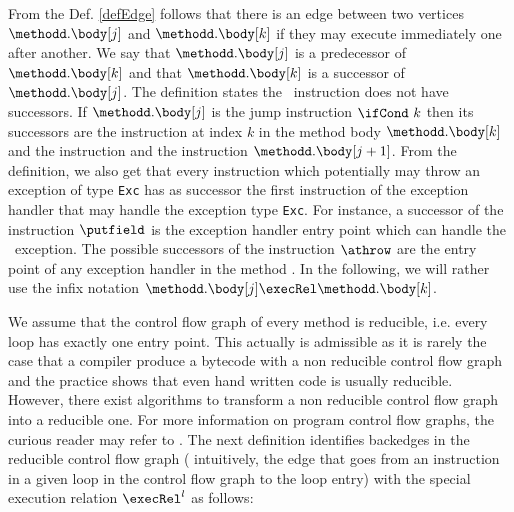 From the Def. \ref{defEdge} follows that there is an edge between two vertices $\methodd.\body[j]$ and  $\methodd.\body[k]$ if they may execute immediately one after another.
 We say that $\methodd.\body[j]$ is a predecessor of $\methodd.\body[k]$ and that  $\methodd.\body[k]$ is a successor of  $\methodd.\body[j]$.
 The definition states the \return \  instruction  does not have successors.
If  $\methodd.\body[j ]$ is the jump instruction $ \ifCond \ k $ then  its successors are the instruction at index $k$ in the method body   
$\methodd.\body[k]$ and the instruction and the instruction $\methodd.\body[j + 1 ]$. 
From the definition, we also get that every instruction which potentially may throw an exception of type \texttt{Exc}
has as successor the first instruction of the exception handler that may handle the exception type \texttt{Exc}. For instance, a successor
of the instruction $\putfield$ is the exception handler entry point which can handle  the \NullPointerExc \ exception. 
The possible successors of the instruction $\athrow$ are the entry point of any  exception handler  in the method \methodd.
In the following, we will rather use the infix notation $\methodd.\body[j] \execRel \methodd.\body[k]$.


We assume that the control flow graph of every method is reducible, i.e. every loop has exactly one entry point. This actually is admissible
as it is rarely the case that a compiler produce a bytecode with a non reducible control flow graph and the practice shows that even hand written
code is usually reducible. However, there exist algorithms to transform a non reducible control flow graph into a reducible one. 
For more information on program control flow graphs, the curious reader may refer to \cite{ARUCom1986}.
The next definition identifies backedges in the reducible control flow graph ( intuitively, the edge that goes 
from an instruction in a given loop in the control flow graph to the loop entry)  with the special execution relation $\execRel^l$ as follows:
 

